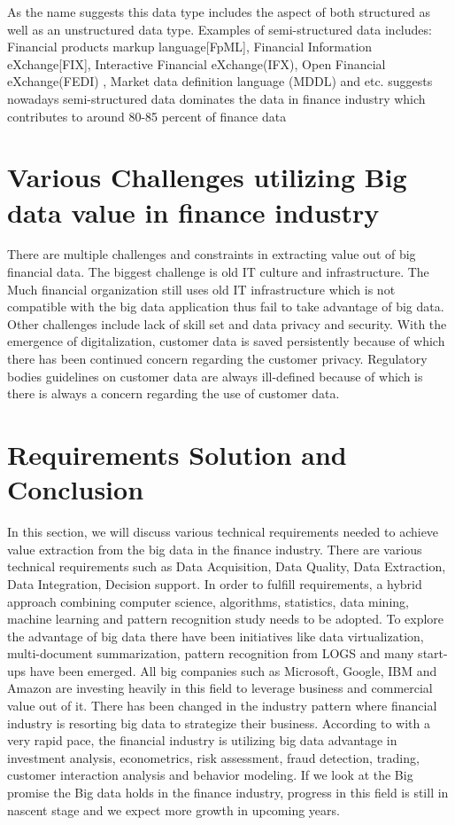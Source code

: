 \documentclass[sigconf]{acmart}
\begin{document}
As the name suggests this data type includes the aspect of both structured as well as an unstructured data type. Examples of semi-structured data includes: Financial products markup language[FpML], Financial Information eXchange[FIX], Interactive Financial eXchange(IFX), Open Financial eXchange(FEDI) , Market data definition language (MDDL) and etc. \cite{Ref1} suggests nowadays semi-structured data dominates the data in finance industry which contributes to around 80-85 percent of finance data

\section{Various Challenges utilizing Big data value in finance industry }

There are multiple challenges and constraints in extracting value out of big financial data. The biggest challenge is old IT culture and infrastructure. The Much financial organization still uses old IT infrastructure which is not compatible with the big data application thus fail to take advantage of big data. Other challenges include lack of skill set and data privacy and security. With the emergence of digitalization, customer data is saved persistently because of which there has been continued concern regarding the customer privacy. Regulatory bodies guidelines on customer data are always ill-defined because of which is there is always a concern regarding the use of customer data.  

\section{Requirements Solution and Conclusion }

In this section, we will discuss various technical requirements needed to achieve value extraction from the big data in the finance industry. There are various technical requirements such as Data Acquisition, Data Quality, Data Extraction, Data Integration, Decision support. In order to fulfill requirements, a hybrid approach combining computer science, algorithms, statistics, data mining, machine learning and pattern recognition study needs to be adopted. To explore the advantage of big data there have been initiatives like data virtualization, multi-document summarization, pattern recognition from LOGS and many start-ups have been emerged.  All big companies such as Microsoft, Google, IBM and Amazon are investing heavily in this field to leverage business and commercial value out of it. There has been changed in the industry pattern where financial industry is resorting big data to strategize their business. According to \cite{Ref3}  with a very rapid pace, the financial industry is utilizing big data advantage in investment analysis, econometrics, risk assessment, fraud detection, trading, customer interaction analysis and behavior modeling. If we look at the Big promise the Big data holds in the finance industry, progress in this field is still in nascent stage and we expect more growth in upcoming years.  
\end{document}
